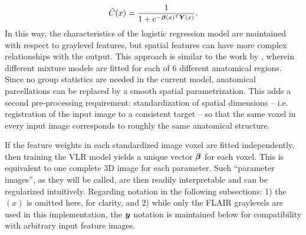\begin{equation}
  \hat{C}(x) = \frac{1}{1+e^{-\bm{\beta}(x)^T\bm{Y}(x)}}.
  \label{eq:eq:vlrmodel}
\end{equation}
In this way, the characteristics of the logistic regression model are maintained with respect to graylevel features, but spatial features can have more complex relationships with the output. This approach is similar to the work by \citeauthor{Harmouche2015} \cite{Harmouche2015}, wherein different mixture models are fitted for each of 6 different anatomical regions. Since no group statistics are needed in the current model, anatomical parcellations can be replaced by a smooth spatial parametrization. This adds a second pre-processing requirement: standardization of spatial dimensions -- i.e. registration of the input image to a consistent target -- so that the same voxel in every input image corresponds to roughly the same anatomical structure.
\par
If the feature weights in each standardized image voxel are fitted independently, then training the VLR model yields a unique vector $\bm{\beta}$ for each voxel. This is equivalent to one complete 3D image for each parameter. Such ``parameter images'', as they will be called, are then readily interpretable and can be regularized intuitively. Regarding notation in the following subsections: 1) the $(x)$ is omitted here, for clarity, and 2) while only the FLAIR graylevels are used in this implementation, the $\bm{y}$ notation is maintained below for compatibility with arbitrary input feature images.
